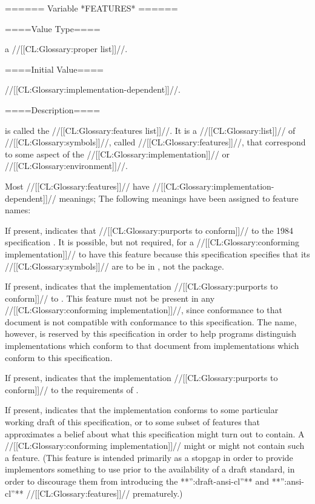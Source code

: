 ====== Variable *FEATURES* ======

====Value Type====

a //[[CL:Glossary:proper list]]//.

====Initial Value====

//[[CL:Glossary:implementation-dependent]]//.

====Description====

 is called the //[[CL:Glossary:features list]]//. It is a //[[CL:Glossary:list]]// of //[[CL:Glossary:symbols]]//, called //[[CL:Glossary:features]]//, that correspond to some aspect of the //[[CL:Glossary:implementation]]// or //[[CL:Glossary:environment]]//.

Most //[[CL:Glossary:features]]// have //[[CL:Glossary:implementation-dependent]]// meanings; The following meanings have been assigned to feature names:

\beginlist


If present, indicates that  //[[CL:Glossary:purports to conform]]// to the 1984 specification \CLtL. It is possible, but not required, for a //[[CL:Glossary:conforming implementation]]// to have this feature because this specification specifies that its //[[CL:Glossary:symbols]]// are to be in , not the  package.


If present, indicates that the implementation //[[CL:Glossary:purports to conform]]// to \CLtLTwo. This feature must not be present in any //[[CL:Glossary:conforming implementation]]//, since conformance to that document is not compatible with conformance to this specification. The name, however, is reserved by this specification in order to help programs distinguish implementations which conform to that document from implementations which conform to this specification.


If present, indicates that the implementation //[[CL:Glossary:purports to conform]]// to the requirements of \IEEEFloatingPoint.


If present, indicates that the implementation conforms to some particular working draft of this specification, or to some subset of features that approximates a belief about what this specification might turn out to contain. A //[[CL:Glossary:conforming implementation]]// might or might not contain such a feature. (This feature is intended primarily as a stopgap in order to provide implementors something to use prior to the availability of a draft standard, in order to discourage them from introducing the **'':draft-ansi-cl''** and **'':ansi-cl''** //[[CL:Glossary:features]]// prematurely.)

